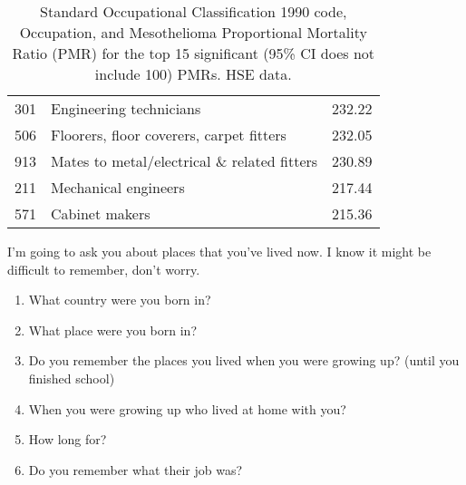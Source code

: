 \documentclass[a4paper,10pt]{article}
\begin{document}
\begin{table}
\begin{tabular}{llr}
                                                                                                             301 &    Engineering technicians                          &  232.22 \\
                                                                                                                     506 &            Floorers, floor coverers, carpet fitters &  232.05 \\
                                                                                                                             913 &        Mates to metal/electrical \& related fitters &  230.89 \\
                                                                                                                                     211 &                                Mechanical engineers &  217.44 \\
                                                                                                                                             571 &                                      Cabinet makers &  215.36 \\ 
                                                                                                                                                     \bottomrule
                                                                                                                                                         \end{tabular}
                                                                                                                                                             \caption{Standard Occupational Classification 1990 code, Occupation, and Mesothelioma Proportional Mortality Ratio (PMR) for the top 15 significant (95\% CI does not include 100) PMRs. HSE data.}
                                                                                                                                                                 \label{table:top15pmr}
 \end{table}

I'm going to ask you about places that you've lived now. I know it might be difficult to remember, don't worry.

\begin{enumerate}[resume]
\item What country were you born in? 
\item What place were you born in?
\item Do you remember the places you lived when you were growing up? (until you finished school) 
\item When you were growing up who lived at home with you?
\item How long for?
\item Do you remember what their job was?
\end{enumerate}
\end{document}
